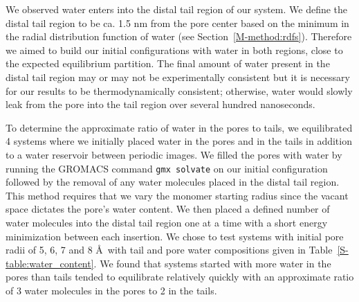 \documentclass{article}
\begin{document}
\begin{enumerate}
	We observed water enters into the distal tail region of our system. We define the 
	distal tail region to be ca. 1.5 nm from the pore center based on the minimum in 
	the radial distribution function of water (see Section~\ref{M-method:rdfs}). Therefore
	we aimed to build our initial configurations with water in both regions, close to
	the expected equilibrium partition. The final amount of water present in the distal
	tail region may or may not be experimentally consistent but it is necessary for our
	results to be thermodynamically consistent; otherwise, water would slowly leak 
	from the pore into the tail region over several hundred nanoseconds. 
	
	To determine the approximate ratio of water in the pores to tails, we equilibrated 4 systems
	where we initially placed water in the pores and in the tails in addition to a water
	reservoir between periodic images. We filled the pores with water by running the 
	GROMACS command \texttt{gmx solvate} on our initial configuration followed by the 
	removal of any water molecules placed in the distal tail region. This method requires
	that we vary the 
    monomer starting radius since the vacant space dictates the pore's 
	water content. We then placed a defined number of water molecules into the distal tail
	region one at a time with a short energy minimization between each insertion.
	We chose to test systems with initial pore radii of 5, 6, 7 and 8 \AA~with tail and 
	pore water compositions given in Table~\ref{S-table:water_content}. We found that 
	systems started with more water in the pores than tails tended to equilibrate relatively
	quickly with an approximate ratio of 3 water molecules in the pores to 2 in the tails.


\end{enumerate}
\end{document}

